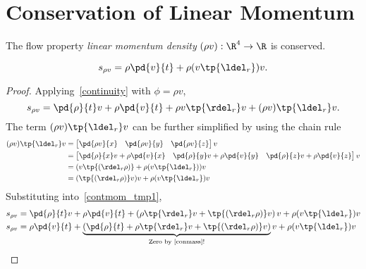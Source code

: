 \section{Conservation of Linear Momentum}
\begin{df}
    The flow property \emph{linear momentum density} $(\rho v):\R^4\to \R$ is conserved.
\end{df}
\begin{thm}
    \begin{equation}
        \label{convlinmom}
        s_{\rho v} = \rho \pd{v}{t} + \rho (v\tp{\ldel_r}) v.
    \end{equation}
\end{thm}
\begin{proof}
    Applying~\autoref{continuity} with $\phi=\rho v$,
    \begin{equation}
        \label{contmom_tmp1}
        s_{\rho v} = \pd{\rho}{t}v + \rho \pd{v}{t}  + \rho v \tp{\rdel_r} v  + (\rho v) \tp{\ldel_r} v.
    \end{equation}
    The term $(\rho v) \tp{\ldel_r}v$ can be further simplified by using the chain rule
    \begin{align}
        (\rho v) \tp{\ldel_r} v &= \begin{bmatrix}
            \pd{\rho v}{x} & \pd{\rho v}{y} & \pd{\rho v}{z}
        \end{bmatrix} v \\
        &= \begin{bmatrix}
            \pd{\rho}{x} v + \rho \pd{v}{x} & \pd{\rho}{y} v + \rho \pd{v}{y} & \pd{\rho}{z} v + \rho \pd{v}{z}
        \end{bmatrix} v \\
        &= (v\tp{(\rdel_r\rho)} + \rho (v\tp{\ldel_r})) v \\
        &= (\tp{(\rdel_r\rho)}v)v + \rho (v\tp{\ldel_r}) v
    \end{align}
    Substituting into~\autoref{contmom_tmp1},
    \begin{align}
        s_{\rho v} &= \pd{\rho}{t}v + \rho \pd{v}{t}  + \left(\rho \tp{\rdel_r} v + \tp{(\rdel_r\rho)}v \right) v  + \rho (v\tp{\ldel_r}) v \\
        s_{\rho v} &= \rho \pd{v}{t}  + \underbrace{\left(\pd{\rho}{t} + \rho \tp{\rdel_r} v + \tp{(\rdel_r\rho)}v \right)}_{\text{Zero by~\autoref{conmass}!}} v  + \rho (v\tp{\ldel_r}) v
    \end{align}
\end{proof}
